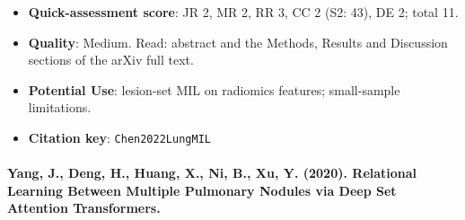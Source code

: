 \documentclass[journal,onecolumn]{IEEEtran}
\begin{document}
\begin{itemize}
\item{} \textbf{Quick-assessment score}: JR 2, MR 2, RR 3, CC 2 (S2: 43), DE 2; total 11.

\item{} \textbf{Quality}: Medium. Read: abstract and the Methods, Results and Discussion sections of the arXiv full text.

\item{} \textbf{Potential Use}: lesion-set MIL on radiomics features; small-sample limitations.

\item{} \textbf{Citation key}: \texttt{Chen2022LungMIL}

\end{itemize}

\paragraph{Yang, J., Deng, H., Huang, X., Ni, B., Xu, Y. (2020). Relational Learning Between Multiple Pulmonary Nodules via Deep Set Attention Transformers.~\cite{Yang2020NoduleSAT}}\mbox{}
\end{document}
